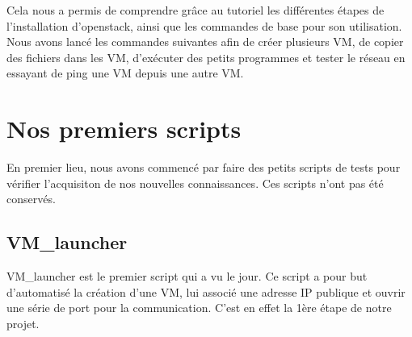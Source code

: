 \documentclass{report}
\begin{document}
            Cela nous a permis de comprendre grâce au tutoriel
            les différentes étapes de l'installation d'openstack, ainsi que les commandes de base pour son utilisation.
            Nous avons lancé les commandes suivantes afin de créer plusieurs VM, de copier des fichiers dans les VM, d'exécuter des petits programmes et tester le réseau
            en essayant de ping une VM depuis une autre VM.
            
            
            
            
            
            
            
            
            
                
    \section{Nos premiers scripts}
    En premier lieu, nous avons commencé par faire des petits scripts de tests pour vérifier l'acquisiton de nos nouvelles connaissances. Ces scripts n'ont pas été conservés.
        \subsection{VM\_launcher}
        VM\_launcher est le premier script qui a vu le jour. Ce script a pour but d'automatisé la création d'une VM, lui associé une adresse IP publique et ouvrir une série de port pour la communication. C'est en effet la 1ère étape de notre projet.
        
\end{document}
